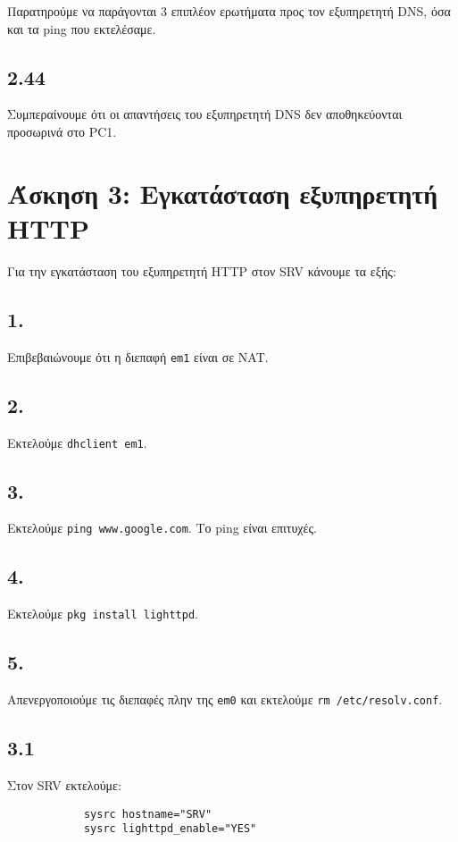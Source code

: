 \documentclass[a4paper, 12pt]{article}
\begin{document}
		Παρατηρούμε να παράγονται 3 επιπλέον ερωτήματα προς τον εξυπηρετητή DNS, όσα και τα ping που εκτελέσαμε.

	\subsection*{2.44}
		Συμπεραίνουμε ότι οι απαντήσεις του εξυπηρετητή DNS δεν αποθηκεύονται προσωρινά στο PC1.

\section*{Άσκηση 3: Εγκατάσταση εξυπηρετητή HTTP}
	
	Για την εγκατάσταση του εξυπηρετητή HTTP στον SRV κάνουμε τα εξής:
	
	\subsection*{1.}
		Επιβεβαιώνουμε ότι η διεπαφή \verb|em1| είναι σε NAT.
		
	\subsection*{2.}
		Εκτελούμε \verb|dhclient em1|.

	\subsection*{3.}
		Εκτελούμε \verb|ping www.google.com|. Το ping είναι επιτυχές.

	\subsection*{4.}
		Εκτελούμε \verb|pkg install lighttpd|.

	\subsection*{5.}
		Απενεργοποιούμε τις διεπαφές πλην της \verb|em0| και εκτελούμε \verb|rm /etc/resolv.conf|.
			
	\subsection*{3.1}
		Στον SRV εκτελούμε:
		
		\begin{verbatim}
			sysrc hostname="SRV"
			sysrc lighttpd_enable="YES"
		\end{verbatim}
\end{document}
